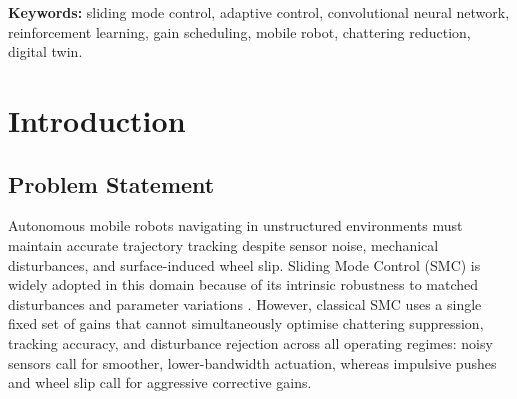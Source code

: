 \documentclass[11pt,a4paper]{article}
\begin{document}
\begin{abstract}
\noindent
Fixed-gain Sliding Mode Control (SMC) cannot simultaneously optimise chattering
suppression and disturbance rejection across diverse operating conditions. We propose
a CNN-adaptive SMC framework in which a lightweight convolutional network classifies
the pre-mission environment from a $64{\times}64$ occupancy map and selects a hand-tuned
SMC parameter preset at run time. Five uncertainty scenarios are evaluated on a simulated
differential-drive robot against classical SMC and three adaptive baselines: fuzzy gain
scheduling, oracle map classification, and reinforcement-learning preset selection.
CNN-adaptive SMC reduces angular-velocity chattering by 35.7\% under sensor noise and
improves final tracking-error recovery by up to 32.7\% under wheel slip and 14.4\% under
impulsive disturbance, approaching oracle performance (17.9\,mm vs.\ 15.6\,mm). On
realistic occupancy maps, EnvironmentCNN reaches 95.1\% classification accuracy. The
complete pipeline is integrated into a real-time 3D digital twin for live demonstration,
controller comparison, and replay.
\end{abstract}

\vspace{0.3cm}
\noindent\textbf{Keywords:} sliding mode control, adaptive control, convolutional neural
network, reinforcement learning, gain scheduling, mobile robot, chattering reduction,
digital twin.

\vspace{0.5cm}
\tableofcontents
\newpage

\section{Introduction}

\subsection{Problem Statement}

Autonomous mobile robots navigating in unstructured environments must maintain accurate
trajectory tracking despite sensor noise, mechanical disturbances, and surface-induced
wheel slip. Sliding Mode Control (SMC) is widely adopted in this domain because of its
intrinsic robustness to matched disturbances and parameter variations
\cite{utkin1992,edwards1998}. However, classical SMC uses a single fixed set of gains
that cannot simultaneously optimise chattering suppression, tracking accuracy, and
disturbance rejection across all operating regimes: noisy sensors call for smoother,
lower-bandwidth actuation, whereas impulsive pushes and wheel slip call for aggressive
corrective gains.
\end{document}

